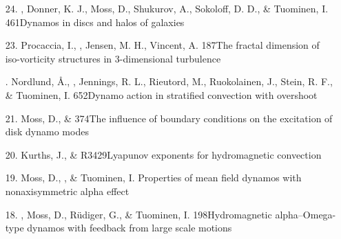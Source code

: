 \begin{itemize}
\item[24.]
\Brandenburg, Donner, K. J., Moss, D., Shukurov, A., Sokoloff, D. D., \& Tuominen, I.
{461}{Dynamos in discs and halos of galaxies}

\item[23.]
Procaccia, I., \Brandenburg, Jensen, M. H., Vincent, A.
{187}{The fractal dimension of iso-vorticity structures
in 3-dimensional turbulence}

\item[\important 22.]
Nordlund, \AA., \Brandenburg, Jennings, R. L., Rieutord, M.,
Ruokolainen, J., Stein, R. F., \& Tuominen, I.
{652}{Dynamo action in stratified convection with overshoot}

\item[21.]
Moss, D., \& \Brandenburg{}
{374}{The influence of boundary conditions on the excitation
of disk dynamo modes}

\item[20.]
Kurths, J., \& \Brandenburg{}
{R3429}{Lyapunov exponents for hydromagnetic convection}

\item[19.]
Moss, D., \Brandenburg, \& Tuominen, I.
{Properties of mean field dynamos with nonaxisymmetric alpha effect}

\item[18.]
\Brandenburg, Moss, D., R\"udiger, G., \& Tuominen, I.
{198}{Hydromagnetic alpha--Omega-type dynamos with feedback
from large scale motions}


\end{itemize}
